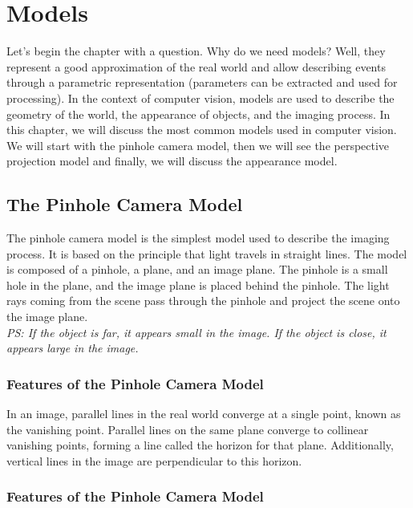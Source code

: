 \chapter{Models}
Let's begin the chapter with a question. Why do we need models?
Well, they represent a good approximation of the real world and allow describing events through a parametric representation (parameters can be extracted and used for processing). In the context of computer vision, models are used to describe the geometry of the world, the appearance of objects, and the imaging process. In this chapter, we will discuss the most common models used in computer vision. We will start with the pinhole camera model, then we will see the perspective projection model and finally, we will discuss the appearance model.
\section{The Pinhole Camera Model}
The pinhole camera model is the simplest model used to describe the imaging process. It is based on the principle that light travels in straight lines. The model is composed of a pinhole, a plane, and an image plane. The pinhole is a small hole in the plane, and the image plane is placed behind the pinhole. The light rays coming from the scene pass through the pinhole and project the scene onto the image plane. 
\\\textit{PS: If the object is far, it appears small in the image. If the object is close, it appears large in the image.}
\subsection{Features of the Pinhole Camera Model}
In an image, parallel lines in the real world converge at a single point, known as the vanishing point. Parallel lines on the same plane converge to collinear vanishing points, forming a line called the horizon for that plane. Additionally, vertical lines in the image are perpendicular to this horizon.

\subsection{Features of the Pinhole Camera Model}

